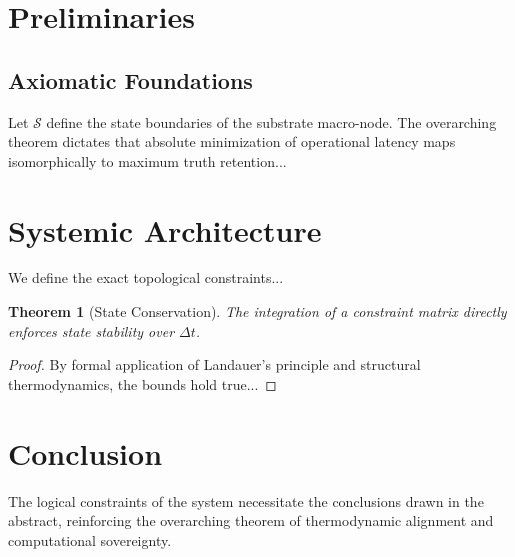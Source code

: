 \documentclass[12pt, a4paper]{article}
\theoremstyle{plain}
\newtheorem{theorem}{Theorem}[section]
\theoremstyle{definition}
\begin{document}
\section{Preliminaries}\label{sec:prelim}
\subsection{Axiomatic Foundations}
Let $\mathcal{S}$ define the state boundaries of the substrate macro-node. The overarching theorem dictates that absolute minimization of operational latency maps isomorphically to maximum truth retention...

\section{Systemic Architecture}\label{sec:architecture}
We define the exact topological constraints...
\begin{theorem}[State Conservation]\label{thm:conservation}
The integration of a constraint matrix directly enforces state stability over $\Delta t$.
\end{theorem}
\begin{proof}
By formal application of Landauer's principle and structural thermodynamics, the bounds hold true...
\end{proof}

\section{Conclusion}\label{sec:conclusion}
The logical constraints of the system necessitate the conclusions drawn in the abstract, reinforcing the overarching theorem of thermodynamic alignment and computational sovereignty.


\vspace{2em}
\noindent\hrulefill
\vspace{1em}







\vspace{3em}
\noindent\hrulefill
\vspace{1em}
\end{document}
